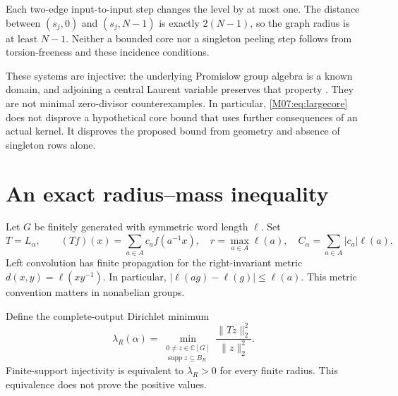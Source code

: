 \documentclass[11pt,a4paper,oneside]{report}
\theoremstyle{definition}
\theoremstyle{remark}
\DeclareMathOperator{\supp}{supp}
\newcommand{\C}{\mathbb C}
\begin{document}
Each two-edge input-to-input step changes the level by at most
one. The distance between $(s_j,0)$ and $(s_j,N-1)$ is exactly
$2(N-1)$, so the graph radius is at least $N-1$.
Neither a bounded core nor a singleton peeling step follows
from torsion-freeness and these incidence conditions.

These systems are injective: the underlying Promislow group
algebra is a known domain, and adjoining a central Laurent
variable preserves that property \cite{B:CP}. They are not
minimal zero-divisor counterexamples. In particular,
\eqref{M07:eq:largecore} does not disprove a hypothetical core
bound that uses further consequences of an actual kernel.
It disproves the proposed bound from geometry and absence
of singleton rows alone.

\section{An exact radius--mass inequality}\label{M07:sec:mass}

Let $G$ be finitely generated with symmetric word length
$\ell$. Set
\[
T=L_\alpha,\qquad (Tf)(x)=\sum_{a\in A}c_a f(a^{-1}x),
\quad r=\max_{a\in A}\ell(a),
\quad C_\alpha=\sum_{a\in A}|c_a|\ell(a).
\]
Left convolution has finite propagation for the right-invariant
metric $d(x,y)=\ell(xy^{-1})$. In particular,
$|\ell(ag)-\ell(g)|\le\ell(a)$. This metric convention matters
in nonabelian groups.

Define the complete-output Dirichlet minimum
\begin{equation}\label{M07:eq:lambda}
\lambda_R(\alpha)=
\min_{\substack{0\ne z\in\C[G]\\\supp z\subseteq B_R}}
\frac{\|Tz\|_2^2}{\|z\|_2^2}.
\end{equation}
Finite-support injectivity is equivalent to $\lambda_R>0$
for every finite radius. This equivalence does not prove the
positive values.
\end{document}
